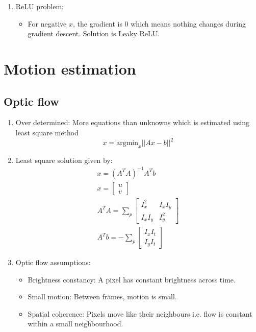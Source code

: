 \documentclass[9pt]{article}
\begin{document}
\begin{multicols*}{2}
\begin{enumerate}
        \item ReLU problem:
        \begin{itemize}
            \item For negative $x$, the gradient is 0 which means nothing
            changes during gradient descent. Solution is Leaky ReLU. 
        \end{itemize}
            
    \end{enumerate}

    \section{Motion estimation}
    \subsection{Optic flow}
    \begin{enumerate}
        \item Over determined: More equations than unknowns which is estimated using least square method
        $$
            x = \text{argmin}_x||Ax - b||^2
        $$

        \item Least square solution given by:
        \begin{gather*}
            x = (A^T A)^{-1} A^T b \\ 
            x = \begin{bmatrix}
                u \\ v
            \end{bmatrix} \\ 
            A^T A = \sum_p \begin{bmatrix}
                I_x^2 & I_x I_y \\ 
                I_x I_y & I_y^2
            \end{bmatrix} \\ 
            A^T b = -\sum_p \begin{bmatrix}
                I_x I_t \\ I_y I_t
            \end{bmatrix}
        \end{gather*}

        \item Optic flow assumptions:
        \begin{itemize}
            \item Brightness constancy: A pixel has constant brightness across time.
            \item Small motion: Between frames, motion is small.
            \item Spatial coherence: Pixels move like their neighbours i.e. flow is constant within a small neighbourhood.
        \end{itemize}


\end{enumerate}
\end{multicols*}
\end{document}
